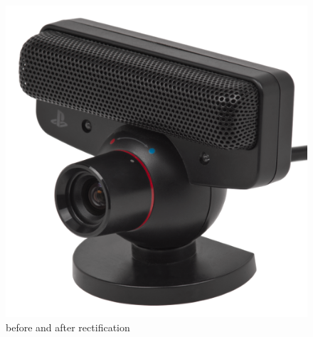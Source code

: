\begin{figure}[hbt] 
    \centering
    \caption{before and after rectification}
    \includegraphics{img/pseye.png}
\end{figure}




 

